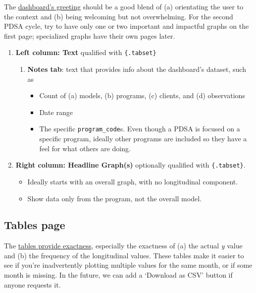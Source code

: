\documentclass[
]{book}
\providecommand{\tightlist}{%
  \setlength{\itemsep}{0pt}\setlength{\parskip}{0pt}}
\begin{document}
The \href{https://ouhscbbmc.github.io/data-science-practices-1/dashboard-1.html\#summary}{dashboard's greeting} should be a good blend of (a) orientating the user to the context and (b) being welcoming but not overwhelming. For the second PDSA cycle, try to have only one or two important and impactful graphs on the first page; specialized graphs have their own pages later.

\begin{enumerate}
\def\labelenumi{\arabic{enumi}.}
\tightlist
\item
  \textbf{Left column: Text} qualified with \texttt{\{.tabset\}}

  \begin{enumerate}
  \def\labelenumii{\arabic{enumii}.}
  \tightlist
  \item
    \textbf{Notes tab}: text that provides info about the dashboard's dataset, such as

    \begin{itemize}
    \tightlist
    \item
      Count of (a) models, (b) programs, (c) clients, and (d) observations
    \item
      Date range
    \item
      The specific \texttt{program\_code}s. Even though a PDSA is focused on a specific program, ideally other programs are included so they have a feel for what others are doing.
    \end{itemize}
  \end{enumerate}
\item
  \textbf{Right column: Headline Graph(s)} optionally qualified with \texttt{\{.tabset\}}.

  \begin{itemize}
  \tightlist
  \item
    Ideally starts with an overall graph, with no longitudinal component.
  \item
    Show data only from the program, not the overall model.
  \end{itemize}
\end{enumerate}

\hypertarget{tables-page}{%
\subsection{Tables page}\label{tables-page}}

The \href{https://ouhscbbmc.github.io/data-science-practices-1/dashboard-1.html\#tables}{tables provide exactness}, especially the exactness of (a) the actual \emph{y} value and (b) the frequency of the longitudinal values. These tables make it easier to see if you're inadvertently plotting multiple values for the same month, or if some month is missing. In the future, we can add a `Download as CSV' button if anyone requests it.
\end{document}
